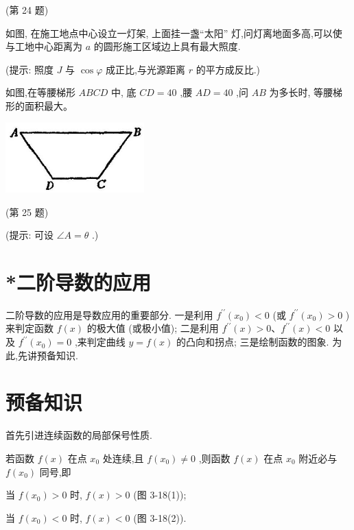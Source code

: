 \documentclass[lang=cn,newtx,12pt,scheme=chinese]{elegantbook}
\begin{document}
\begin{problemset}[习 题 十 一]
(第 24 题)

\item 如图, 在施工地点中心设立一灯架, 上面挂一盏“太阳” 灯,问灯离地面多高,可以使与工地中心距离为 \(a\) 的圆形施工区域边上具有最大照度.

(提示: 照度 \(J\) 与 \(\cos \varphi\) 成正比,与光源距离 \(r\) 的平方成反比.)

\item 如图,在等腰梯形 \({ABCD}\) 中, 底 \({CD} = {40}\) ,腰 \({AD} = {40}\) ,问 \({AB}\) 为多长时, 等腰梯形的面积最大。

\begin{center}
\includegraphics[max width=0.4\textwidth]{images/01912c18-5c3f-733d-b775-749ba9897a9d_159_135403.jpg}
\end{center}

(第 25 题)

(提示: 可设 \(\angle A = \theta\) .)

\end{problemset}

\section*{*二阶导数的应用}

二阶导数的应用是导数应用的重要部分. 一是利用 \({f}^{\prime \prime }\left( {x}_{0}\right) < 0\) (或 \({f}^{\prime \prime }\left( {x}_{0}\right) > 0\) ) 来判定函数 \(f\left( x\right)\) 的极大值 (或极小值); 二是利用 \({f}^{\prime \prime }\left( x\right) > 0\text{、}{f}^{\prime \prime }\left( x\right) < 0\) 以及 \({f}^{\prime \prime }\left( {x}_{0}\right) = 0\) ,来判定曲线 \(y = f\left( x\right)\) 的凸向和拐点; 三是绘制函数的图象. 为此,先讲预备知识.

\section{预备知识}

首先引进连续函数的局部保号性质.

\begin{theorem}[局部保号性质]

若函数 \(f\left( x\right)\) 在点 \({x}_{0}\) 处连续,且 \(f\left( {x}_{0}\right) \neq 0\) ,则函数 \(f\left( x\right)\) 在点 \({x}_{0}\) 附近必与 \(f\left( {x}_{0}\right)\) 同号,即

当 \(f\left( {x}_{0}\right) > 0\) 时, \(f\left( x\right) > 0\) (图 3-18(1));

当 \(f\left( {x}_{0}\right) < 0\) 时, \(f\left( x\right) < 0\) (图 3-18(2)).

\end{theorem}
\end{document}
